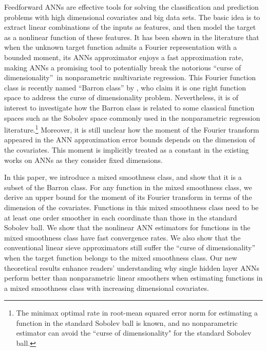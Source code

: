 \documentclass[11pt]{article}
\numberwithin{equation}{section}
\begin{document}
Feedforward ANNs are effective tools for solving the classification and prediction problems with high dimensional covariates and big data sets.  The basic idea is to extract linear combinations of the inputs as features, and then model the target as a nonlinear function of these features. It has been shown in the literature %
\citep{barron1993universal,hornik1994degree,chen1999improved,klusowski2018approximation}
that when the unknown target function admits a Fourier representation with a bounded
moment, its ANNs approximator enjoys a fast approximation rate, making ANNs
a promising tool to potentially break the notorious \textquotedblleft curse
of dimensionality\textquotedblright\ in nonparametric multivariate
regression. This Fourier function class is recently named ``Barron class'' by  \cite{e2022barron}, who claim it is one right function space to address the curse of dimensionality problem. Nevertheless, it is of interest to investigate how the Barron class is related to some classical function spaces such as the Sobolev space \citep{stone1994,Wasserman2006} commonly used in the nonparametric regression literature.\footnote{The minimax optimal rate in root-mean squared error norm for estimating a function in the standard Sobolev ball is known, and no nonparametric estimator can avoid the ``curse of dimensionality" for the standard Sobolev ball.} Moreover, it is still unclear how the
moment of the Fourier transform appeared in the ANN approximation error bounds depends on the dimension of the covariates. This moment is implicitly treated as a constant in the existing works on ANNs %
\citep{barron1993universal,chen1999improved,klusowski2018approximation} as
they consider fixed dimensions.

In this paper, we introduce a mixed smoothness class, and show that it is a subset of the Barron class. For any function in the mixed smoothness class, we derive an upper bound for the moment of its Fourier transform in terms of the dimension of the covariates. Functions in this mixed smoothness class need to be at least one order smoother in each coordinate than those in the standard Sobolev ball. We show that the nonlinear ANN estimators for functions in the mixed smoothness class have fast convergence rates. We also show that the conventional linear sieve approximators still suffer the ``curse of dimensionality'' when the target function belongs to the mixed smoothness class.
%
Our new theoretical results enhance readers' understanding why single hidden layer ANNs perform better than nonparametric linear smoothers when estimating functions in a mixed smoothness class with increasing dimensional covariates.
\end{document}
